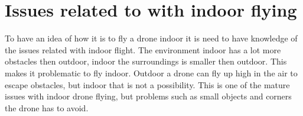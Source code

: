 \section{Issues related to with indoor flying}\label{s:indoor_flying}
To have an idea of how it is to fly a drone indoor it is need to have knowledge of the issues related with indoor flight.
The environment indoor has a lot more obstacles then outdoor, indoor the surroundings is smaller then outdoor. This makes it problematic to fly indoor. Outdoor a drone can fly up high in the air to escape obstacles, but indoor that is not a possibility. This is one of the mature issues with indoor drone flying, but problems such as small objects and corners the drone has to avoid.
\newline
